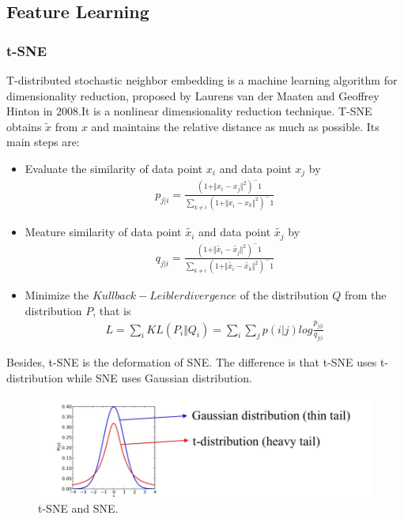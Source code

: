 \documentclass{article}
\begin{document}
\subsection{Feature Learning}
\subsubsection{t-SNE}
\indent T-distributed stochastic neighbor embedding is a machine learning algorithm for dimensionality reduction, proposed by Laurens van der Maaten and Geoffrey Hinton in 2008.\cite{maaten2008visualizing}It is a nonlinear dimensionality reduction technique. T-SNE obtains $\tilde{x}$ from $x$ and maintains the relative distance as much as possible. Its main steps are:
\begin{itemize}
	\item  Evaluate the similarity of data point $x_i$ and data point $x_j$ by
	\begin{eqnarray}
	p_{j|i}=\frac{(1+\Vert x_i-x_j \Vert^2)^-1}{\sum_{k\neq i}(1+\Vert x_i-x_k \Vert^2)^-1}
	\end{eqnarray}
	
	\item  Meature similarity of data point $\tilde{x_i}$ and data point $\tilde{x_j}$ by
	\begin{eqnarray}
	q_{j|i}=\frac{(1+\Vert \tilde{x_i}-\tilde{x_j} \Vert^2)^-1}{\sum_{k\neq i}(1+\Vert \tilde{x_i}-\tilde{x_k} \Vert^2)^-1}
	\end{eqnarray}
	
	\item  Minimize the $Kullback-Leibler divergence$ of the distribution $Q$ from the distribution $P$, that is
	\begin{eqnarray}
	L = \sum_{i}KL(P_i\Vert Q_i)=\sum_{i}\sum_{j}p(i|j)log\frac{p_{j|i}}{q_{j|i}}
	\end{eqnarray}
\end{itemize}

\indent Besides, t-SNE is the deformation of SNE. The difference is that t-SNE uses t-distribution while SNE uses Gaussian distribution.
\begin{figure}[htbp]
	\centering
	\includegraphics[scale=0.3]{figure/SNE.jpg}
	\caption{t-SNE and SNE.}
	\label{fig:SNE}
\end{figure}\par
\end{document}
